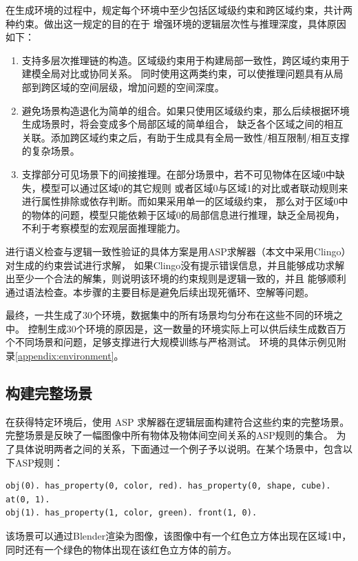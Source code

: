 在生成环境的过程中，规定每个环境中至少包括区域级约束和跨区域约束，共计两种约束。做出这一规定的目的在于
增强环境的逻辑层次性与推理深度，具体原因如下：
\begin{enumerate}[nosep]
\item 支持多层次推理链的构造。区域级约束用于构建局部一致性，跨区域约束用于建模全局对比或协同关系。
同时使用这两类约束，可以使推理问题具有从局部到跨区域的空间层级，增加问题的空间深度。
\item 避免场景构造退化为简单的组合。如果只使用区域级约束，那么后续根据环境生成场景时，将会变成多个局部区域的简单组合，
缺乏各个区域之间的相互关联。添加跨区域约束之后，有助于生成具有全局一致性/相互限制/相互支撑的复杂场景。
\item 支撑部分可见场景下的间接推理。在部分场景中，若不可见物体在区域0中缺失，模型可以通过区域0的其它规则
或者区域0与区域1的对比或者联动规则来进行属性排除或依存判断。而如果采用单一的区域级约束，
那么对于区域0中的物体的问题，模型只能依赖于区域0的局部信息进行推理，缺乏全局视角，不利于考察模型的宏观层面推理能力。
\end{enumerate}

进行语义检查与逻辑一致性验证的具体方案是用ASP求解器（本文中采用Clingo）对生成的约束尝试进行求解，
如果Clingo没有提示错误信息，并且能够成功求解出至少一个合法的解集，则说明该环境的约束规则是逻辑一致的，并且
能够顺利通过语法检查。本步骤的主要目标是避免后续出现死循环、空解等问题。

最终，一共生成了30个环境，数据集中的所有场景均匀分布在这些不同的环境之中。
控制生成30个环境的原因是，这一数量的环境实际上可以供后续生成数百万个不同场景和问题，足够支撑进行大规模训练与严格测试。
环境的具体示例见附录\ref{appendix:environment}。

\subsection{构建完整场景}
在获得特定环境后，使用 ASP 求解器在逻辑层面构建符合这些约束的完整场景。
完整场景是反映了一幅图像中所有物体及物体间空间关系的ASP规则的集合。
为了具体说明两者之间的关系，下面通过一个例子予以说明。在某个场景中，包含以下ASP规则：
\begin{lstlisting}
obj(0). has_property(0, color, red). has_property(0, shape, cube). at(0, 1).
obj(1). has_property(1, color, green). front(1, 0).
\end{lstlisting}
该场景可以通过Blender渲染为图像，该图像中有一个红色立方体出现在区域1中，
同时还有一个绿色的物体出现在该红色立方体的前方。

